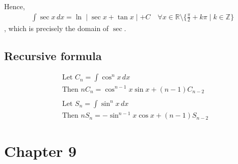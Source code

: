 \documentclass{article}
\begin{document}
Hence, 
\begin{align*}
    \int \sec x\, dx=\ln \mid \sec x+\tan x \mid + C \quad \forall x\in \mathbb{R}\setminus \{\frac{\pi}{2} +k\pi \mid k\in \mathbb{Z}\}
\end{align*}
, which is precisely the domain of $\sec$.

\subsection{Recursive formula}
\begin{align*}
    &\text{Let } C_n=\int \cos^nx\, dx\\
    &\text{Then } nC_n=\cos^{n-1}x\sin x+(n-1)C_{n-2}\\
    \\
    &\text{Let } S_n=\int \sin^nx\, dx\\
    &\text{Then } nS_n=-\sin^{n-1}x\cos x+(n-1)S_{n-2}
\end{align*}


\section{Chapter 9}
\end{document}
